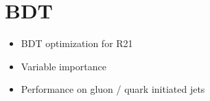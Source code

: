 \chapter{BDT}
\label{sec:bdt}

\begin{itemize}
\item BDT optimization for R21

\item Variable importance

\item Performance on gluon / quark initiated jets

\end{itemize}

